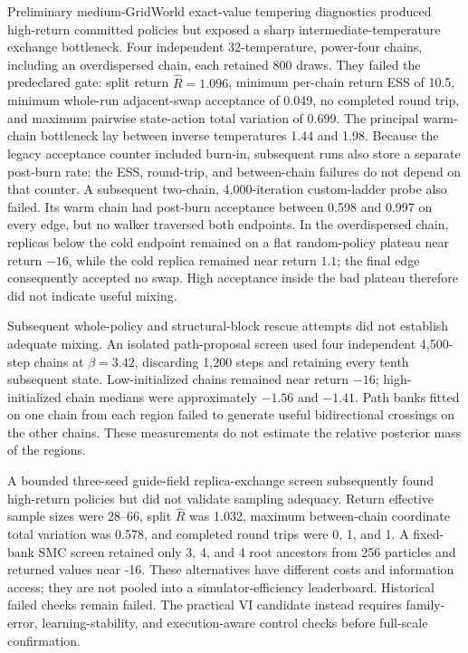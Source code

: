 Preliminary medium-GridWorld exact-value
tempering diagnostics produced high-return committed policies but exposed a sharp
intermediate-temperature exchange bottleneck.  Four independent 32-temperature,
power-four chains, including an overdispersed chain, each retained 800 draws.
They failed the predeclared gate: split return \(\widehat R=1.096\), minimum
per-chain return ESS of 10.5, minimum whole-run adjacent-swap acceptance of 0.049, no
completed round trip, and maximum pairwise state-action total variation of 0.699.
The principal warm-chain bottleneck lay between inverse temperatures 1.44 and
1.98.  Because the legacy acceptance counter included burn-in, subsequent runs
also store a separate post-burn rate; the ESS, round-trip, and between-chain
failures do not depend on that counter.  A subsequent two-chain,
4,000-iteration custom-ladder probe also failed.  Its warm chain had
post-burn acceptance between 0.598 and 0.997 on every edge, but no walker
traversed both endpoints.  In the overdispersed chain, replicas below the cold
endpoint remained on a flat random-policy plateau near return \(-16\), while
the cold replica remained near return \(1.1\); the final edge consequently
accepted no swap.  High acceptance inside the bad plateau therefore did not
indicate useful mixing.

Subsequent whole-policy and structural-block rescue attempts did not establish
adequate mixing. An isolated path-proposal screen used four independent
4,500-step chains at \(\beta=3.42\), discarding 1,200 steps and retaining
every tenth subsequent state. Low-initialized chains remained near return
\(-16\); high-initialized chain medians were approximately \(-1.56\) and
\(-1.41\). Path banks fitted on one chain from each region failed to generate
useful bidirectional crossings on the other chains. These measurements do not
estimate the relative posterior mass of the regions.

A bounded three-seed guide-field replica-exchange screen subsequently found
high-return policies but did not validate sampling adequacy. Return effective
sample sizes were 28--66, split \(\widehat R\) was 1.032, maximum between-chain
coordinate total variation was 0.578, and completed round trips were 0, 1, and 1.
A fixed-bank SMC screen retained only 3, 4, and 4 root ancestors from 256
particles and returned values near -16. These alternatives have different
costs and information access; they are not pooled into a simulator-efficiency
leaderboard. Historical failed checks remain failed. The practical VI candidate
instead requires family-error, learning-stability, and execution-aware control
checks before full-scale confirmation.

